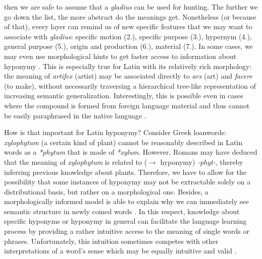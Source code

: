 then we are safe to assume that a \textit{gladius} can be used for hunting. The further we go down the list, the more abstract do the meanings get. Nonetheless (or because of that), every layer can remind us of new specific features that we may want to associate with \textit{gladius}: specific motion (2.), specific purpose (3.), hypernym (4.), general purpose (5.), origin and production (6.), material (7.). In some cases, we may even use morphological hints to get faster access to information about hyponymy \parencite[913]{anstattTypenSemantischerRelationen2009}. This is especially true for Latin with its relatively rich morphology: the meaning of \textit{artifex} (artist) may be associated directly to \textit{ars} (art) and \textit{facere} (to make), without necessarily traversing a hierarchical tree-like representation of increasing semantic generalization. Interestingly, this is possible even in cases where the compound is formed from foreign language material and thus cannot be easily paraphrased in the native language \parencite[33]{souille-rigautSemanticAccountQuasiLexemes2010}. 

How is that important for Latin hyponymy? Consider Greek loanwords: \textit{xylophytum} (a certain kind of plant) cannot be reasonably described in Latin words as a \textit{*phytum} that is made of \textit{*xylum}. However, Romans may have deduced that the meaning of \textit{xylophytum} is related to ($\rightarrow$ hyponymy) \textit{-phyt-}, thereby inferring previous knowledge about plants. Therefore, we have to allow for the possibility that some instances of hyponymy may not be extractable solely on a distributional basis, but rather on a morphological one. Besides, a morphologically informed model is able to explain why we can immediately see semantic structure in newly coined words \parencite[43]{souille-rigautSemanticAccountQuasiLexemes2010}. In this respect, knowledge about specific hyponyms or hyponymy in general can facilitate the language learning process by providing a rather intuitive access to the meaning of single words or phrases. Unfortunately, this intuition sometimes competes with other interpretations of a word's sense which may be equally intuitive and valid \parencite[126]{ponsborderiaPathsGrammaticalizationSpanish2014}. 


